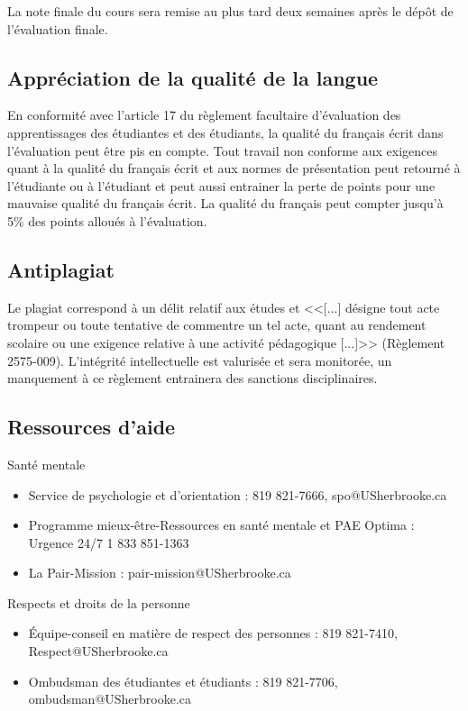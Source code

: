 \documentclass[12]{article}
\begin{document}
    La note finale du cours sera remise au plus tard deux semaines après le
	dépôt de l'évaluation finale.

    \subsection*{Appréciation de la qualité de la langue}

    En conformité avec l'article 17 du règlement facultaire d'évaluation
    des apprentissages des étudiantes et des étudiants, la qualité du français
    écrit dans l’évaluation peut être pis en compte. Tout travail non conforme
    aux exigences quant à la qualité du français écrit et aux normes de
    présentation  peut retourné à l'étudiante ou à l'étudiant et peut aussi
    entrainer la perte de points pour une mauvaise qualité du français écrit.
    La qualité du français peut compter jusqu'à 5\% des points alloués à
    l'évaluation.

	\subsection*{Antiplagiat}

	Le plagiat correspond à un délit relatif aux études et <<[...] désigne tout acte 
	trompeur ou toute tentative de commentre un tel acte, quant au rendement
	scolaire ou une exigence relative à une activité pédagogique [...]>> 
	(Règlement 2575-009). L'intégrité intellectuelle est valurisée et sera monitorée, 
	un manquement à ce règlement entrainera des sanctions disciplinaires.

	\subsection*{Ressources d'aide}

	Santé mentale 
	\begin{itemize}
		\item Service de psychologie et d'orientation : 819 821-7666, spo@USherbrooke.ca
		\item Programme mieux-être-Ressources en santé mentale et PAE Optima : Urgence 24/7 1 833 851-1363
		\item La Pair-Mission : pair-mission@USherbrooke.ca
	\end{itemize}
		
	Respects et droits de la personne
	\begin{itemize}
		\item Équipe-conseil en matière de respect des personnes : 819 821-7410, Respect@USherbrooke.ca
		\item Ombudsman des étudiantes et étudiants : 819 821-7706, ombudsman@USherbrooke.ca
	\end{itemize}
\end{document}

